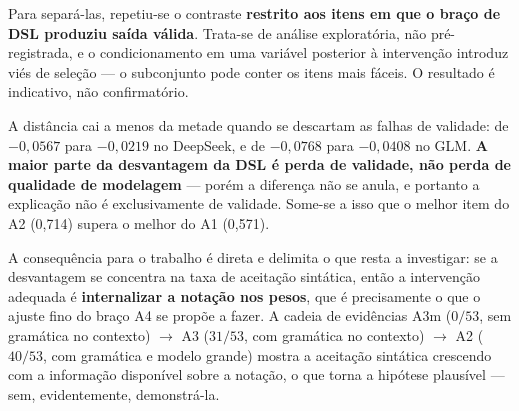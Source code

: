 Para separá-las, repetiu-se o contraste \textbf{restrito aos itens em que o braço de DSL produziu saída válida}. Trata-se de análise exploratória, não pré-registrada, e o condicionamento em uma variável posterior à intervenção introduz viés de seleção — o subconjunto pode conter os itens mais fáceis. O resultado é indicativo, não confirmatório.

\begin{table}[h!]
\end{table}

A distância cai a menos da metade quando se descartam as falhas de validade: de $-0{,}0567$ para $-0{,}0219$ no DeepSeek, e de $-0{,}0768$ para $-0{,}0408$ no GLM. \textbf{A maior parte da desvantagem da DSL é perda de validade, não perda de qualidade de modelagem} — porém a diferença não se anula, e portanto a explicação não é exclusivamente de validade. Some-se a isso que o melhor item do A2 (0,714) supera o melhor do A1 (0,571).

A consequência para o trabalho é direta e delimita o que resta a investigar: se a desvantagem se concentra na taxa de aceitação sintática, então a intervenção adequada é \textbf{internalizar a notação nos pesos}, que é precisamente o que o ajuste fino do braço A4 se propõe a fazer. A cadeia de evidências A3m ($0/53$, sem gramática no contexto) $\rightarrow$ A3 ($31/53$, com gramática no contexto) $\rightarrow$ A2 ($40/53$, com gramática e modelo grande) mostra a aceitação sintática crescendo com a informação disponível sobre a notação, o que torna a hipótese plausível — sem, evidentemente, demonstrá-la.

